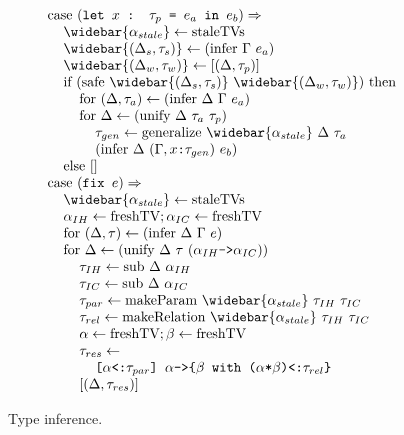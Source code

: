 \documentclass[acmsmall]{acmart}
\begin{document}
\begin{figure*}[h]
\[\begin{array}[t]{@{} l}
    \I \text{case } (\code{let $x$ : $\tau_p$ = $e_a$ in $e_b$}) \Rightarrow  
    \\
    \I\I \widebar{\alpha_{stale}} \leftarrow \text{staleTVs}
    \\
    \I\I \widebar{(\Delta_s, \tau_s)} \leftarrow (\text{infer } \Gamma\ e_a)
    \\
    \I\I \widebar{(\Delta_w, \tau_w)} \leftarrow [(\Delta, \tau_p)]
    \\
    \I\I \text{if } (\text{safe } \widebar{(\Delta_s, \tau_s)}\ \widebar{(\Delta_w, \tau_w)} ) \text{ then }
    \\
    \I\I\I \text{for } (\Delta, \tau_a) \leftarrow (\text{infer } \Delta\ \Gamma\ e_a)
    \\
    \I\I\I \text{for } \Delta \leftarrow (\text{unify } \Delta\ \tau_a\ \tau_p)
    \\
    \I\I\I\I \tau_{gen} \leftarrow \text{generalize } \widebar{\alpha_{stale}}\ \Delta\ \tau_a
    \\
    \I\I\I\I (\text{infer } \Delta\ (\Gamma,\code{$x$:$\tau_{gen}$})\ e_b)
    \\
    \I\I \text{else } [] 

    \\

    \I \text{case } (\code{fix $e$}) \Rightarrow  
    \\
    \I\I \widebar{\alpha_{stale}} \leftarrow \text{staleTVs}
    \\
    \I\I \alpha_{IH} \leftarrow \text{freshTV}; \alpha_{IC} \leftarrow \text{freshTV}
    \\
    \I\I \text{for } (\Delta, \tau) \leftarrow (\text{infer}\ \Delta\ \Gamma\ e) 
    \\
    \I\I \text{for } \Delta \leftarrow (\text{unify}\ \Delta\ \tau\ (\code{$\alpha_{IH}$->$\alpha_{IC}$})) 
    \\
    \I\I\I \tau_{IH} \leftarrow \text{sub}\ \Delta\ \alpha_{IH}  
    \\
    \I\I\I \tau_{IC} \leftarrow \text{sub}\ \Delta\ \alpha_{IC}
    \\
    \I\I\I \tau_{par} \leftarrow \text{makeParam}\ \widebar{\alpha_{stale}}\ \tau_{IH}\ \tau_{IC}
    \\
    \I\I\I \tau_{rel} \leftarrow \text{makeRelation}\ \widebar{\alpha_{stale}}\ \tau_{IH}\ \tau_{IC}
    \\
    \I\I\I \alpha \leftarrow \text{freshTV}; \beta \leftarrow \text{freshTV}
    \\
    \I\I\I \tau_{res} \leftarrow
    \\
    \I\I\I\I \code{[$\alpha$<:$\tau_{par}$] $\alpha$->\{$\beta$ with ($\alpha$*$\beta$)<:$\tau_{rel}$\}}
    \\
    \I\I\I [(\Delta, \tau_{res})]

\end{array}
\]
\caption{Type inference.}
\end{figure*}
\end{document}
